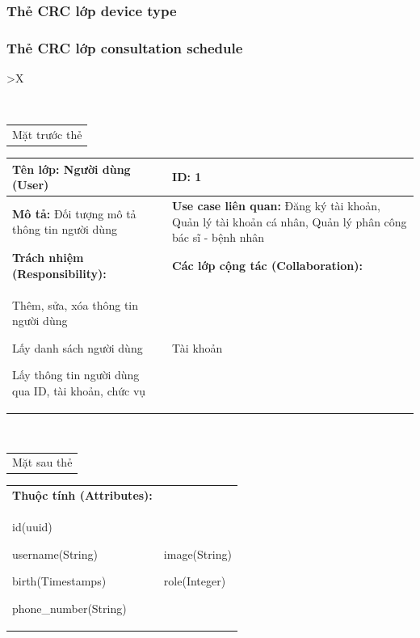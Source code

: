 \subsubsection{Thẻ CRC lớp device type}

\subsubsection{Thẻ CRC lớp consultation schedule}





\begin{xltabular}{\textwidth}{
   >{\centering\arraybackslash}X 
  }
  \caption{\bfseries \fontsize{12pt}{0pt}\selectfont Thẻ CRC lớp Người dùng}
  \\
  \begin{tabularx}{0.9\textwidth}{X}
    Mặt trước thẻ
  \end{tabularx}
  \begin{tabularx}{0.9\textwidth}{|X|X|}
    \hline
    \textbf{Tên lớp:} Người dùng (User) & \textbf{ID:} 1 \\
    \hline
    \textbf{Mô tả:} Đối tượng mô tả thông tin người dùng & \textbf{Use case liên quan:}  Đăng ký tài khoản, Quản lý tài khoản cá nhân, Quản lý phân công bác sĩ - bệnh nhân\\
    \hline
    \textbf{Trách nhiệm (Responsibility):} & \textbf{Các lớp cộng tác (Collaboration):} \\
    Thêm, sửa, xóa thông tin người dùng 

    Lấy danh sách người dùng

    Lấy thông tin người dùng qua ID, tài khoản, chức vụ
    & 
    Tài khoản
    \\
    \hline
  \end{tabularx}
  \\ 
  \begin{tabularx}{0.9\textwidth}{X}
    Mặt sau thẻ
  \end{tabularx} 
  \begin{tabularx}{0.9\textwidth}{|X|X|}
    \hline
    \textbf{Thuộc tính (Attributes):} & \\
    id(uuid) 
    
    username(String)

    birth(Timestamps)

    phone\_number(String)
    & 
    image(String) 
    
    role(Integer) 
    

\end{tabularx}
\end{xltabular}
